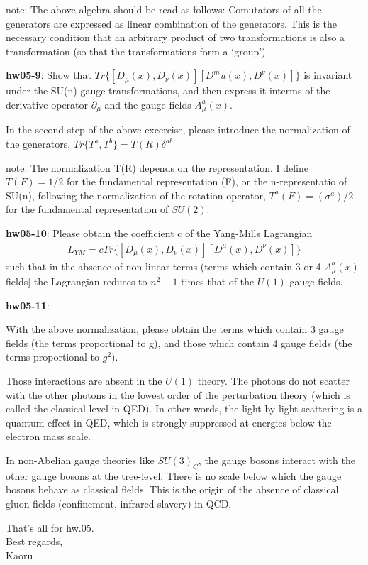 \documentclass[12pt]{article}
\def\del{{\partial}}
\begin{document}
  note: The above algebra should be read as follows:
        Comutators of all the generators are expressed
        as linear combination of the generators.  This is
        the necessary condition that an arbitrary product
        of two transformations is also a transformation
        (so that the transformations form a `group').

{\bf hw05-9}:
  Show that
  $Tr \{ [D_\mu(x), D_\nu(x)] [D^mu(x),D^\nu(x)] \}$
  is invariant under the SU(n) gauge transformations, and
  then express it interms of the derivative operator $\del_\mu$
  and the gauge fields $A^a_\mu(x)$.

  In the second step of the above excercise, please
  introduce the normalization of the generators,
  $Tr\{ T^a, T^b \} = T(R) \delta^{ab}$

  note: The normalization T(R) depends on the representation.
        I define
        $T(F) = 1/2$
        for the fundamental representation (F), or the
        n-representatio of SU(n), following the normalization
        of the rotation operator,
        $T^a(F) = (\sigma^a)/2$
        for the fundamental representation of $SU(2)$.

{\bf hw05-10}:
  Please obtain the coefficient c of the Yang-Mills Lagrangian
\begin{eqnarray}
    L_{YM} = c Tr\{ [D_\mu(x), D_\nu(x)] [D^\mu(x),D^\nu(x)] \}
\end{eqnarray}
  such that in the absence of non-linear terms (terms which
  contain 3 or 4 $A^a_\mu(x)$ fields] the Lagrangian reduces
  to $n^2-1$ times that of the $U(1)$ gauge fields.

{\bf hw05-11}:

  With the above normalization, please obtain the terms which
  contain 3 gauge fields (the terms proportional to g), and
  those which contain 4 gauge fields (the terms proportional
  to $g^2$).

  Those interactions are absent in the $U(1)$ theory.  The photons
  do not scatter with the other photons in the lowest order of
  the perturbation theory (which is called the classical level
  in QED).  In other words, the light-by-light scattering is
  a quantum effect in QED, which is strongly suppressed at
  energies below the electron mass scale.

  In non-Abelian gauge theories like $SU(3)_C$, the gauge bosons
  interact with the other gauge bosons at the tree-level.
  There is no scale below which the gauge bosons behave as
  classical fields.  This is the origin of the absence of
  classical gluon fields (confinement, infrared slavery)
  in QCD.

That's all for hw.05.\\

Best regards,\\

Kaoru
\end{document}
